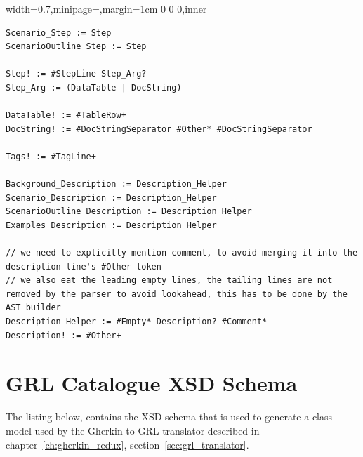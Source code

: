 \documentclass[dissertation,final]{softeng}
\newenvironment{featurecode}[1]
{ \lrbox\featurebox \begin{adjustbox}{width=#1\textwidth,minipage=\textwidth,margin=1cm 0 0 0,inner} }
{ \end{adjustbox}\endlrbox}
\newenvironment{featurelist}[2]
{
\newcommand{\setcaption}{\caption{#1}}
\newcommand{\setlabel}{\label{#2}}
}
{\begin{listing}[h!]\centering\usebox\featurebox\setcaption\setlabel\end{listing}}
\begin{document}
\begin{appendices}
\begin{featurelist}{Updated gherkin grammar}{lst:updated_gherkin_grammar}
\begin{featurecode}{0.7}
\begin{verbatim}
Scenario_Step := Step
ScenarioOutline_Step := Step

Step! := #StepLine Step_Arg?
Step_Arg := (DataTable | DocString)

DataTable! := #TableRow+
DocString! := #DocStringSeparator #Other* #DocStringSeparator

Tags! := #TagLine+

Background_Description := Description_Helper
Scenario_Description := Description_Helper
ScenarioOutline_Description := Description_Helper
Examples_Description := Description_Helper

// we need to explicitly mention comment, to avoid merging it into the description line's #Other token
// we also eat the leading empty lines, the tailing lines are not removed by the parser to avoid lookahead, this has to be done by the AST builder
Description_Helper := #Empty* Description? #Comment*
Description! := #Other+
\end{verbatim}
\end{featurecode}
\end{featurelist}

\chapter{GRL Catalogue XSD Schema}
\label{ch:grl_catalogue_schema}
The listing below, contains the XSD schema that is used to generate a class model used by the Gherkin to GRL translator described in chapter~\ref{ch:gherkin_redux}, section~\ref{sec:grl_translator}.


\end{appendices}
\end{document}
